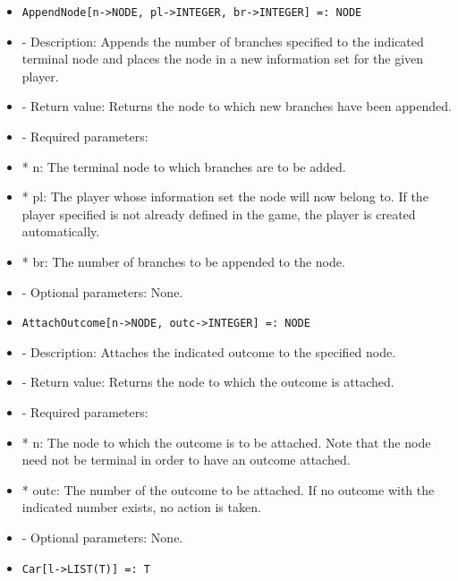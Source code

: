 \begin{itemize}
\item
\begin{verbatim}
AppendNode[n->NODE, pl->INTEGER, br->INTEGER] =: NODE
\end{verbatim}

\bd
\item
- Description:  Appends the number of branches specified to the
indicated terminal node and places the node in a new information set
for the given player.
\item
- Return value: Returns the node to which new branches have been appended.
\item
- Required parameters:

\bd
\item
*  n:  The terminal node to which branches are to be added.
\item
*  pl:  The player whose information set the node will now belong to.
If the player specified is not already defined in the game, the player
is created automatically. 
\item
*  br:  The number of branches to be appended to the node.
\ed

\item
- Optional parameters:  None.
\ed

\item
\begin{verbatim}
AttachOutcome[n->NODE, outc->INTEGER] =: NODE
\end{verbatim}

\bd
\item
- Description:  Attaches the indicated outcome to the specified node.
\item
- Return value:  Returns the node to which the outcome is attached.
\item
- Required parameters:

\bd
\item
*  n:  The node to which the outcome is to be attached.  Note that the
node need not be terminal in order to have an outcome attached.
\item
*  outc:  The number of the outcome to be attached.  If no outcome
with the indicated number exists, no action is taken.  
\ed

\item
- Optional parameters:  None.
\ed

\item

\begin{verbatim}
Car[l->LIST(T)] =: T	
\end{verbatim}


\end{itemize}
